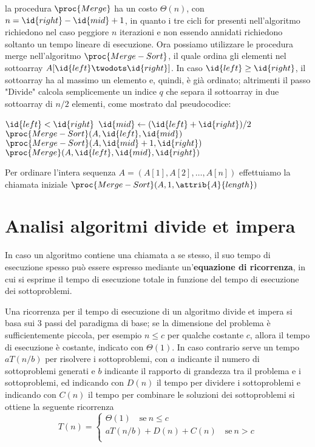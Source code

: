 la procedura $\proc{Merge}$ ha un costo $\Theta(n)$, con $n = \id{right} - \id{mid} + 1$, in quanto
i tre cicli for presenti nell'algoritmo richiedono nel caso peggiore $n$ iterazioni
e non essendo annidati richiedono soltanto un tempo lineare di esecuzione.
Ora possiamo utilizzare le procedura merge nell'algoritmo $\proc{Merge-Sort}$, il quale
ordina gli elementi nel sottoarray $A[\id{left}\twodots \id{right}]$.
In caso $\id{left} \geq \id{right}$, il sottoarray ha al massimo un elemento e, quindi, è già ordinato;
altrimenti il passo "Divide" calcola semplicemente un indice $q$ che separa il sottoarray
in due sottoarray di $n/2$ elementi, come mostrato dal pseudocodice:
\begin{codebox}
\li \If $\id{left} < \id{right}$
    \Then
\li     $\id{mid} \gets (\id{left} + \id{right})/ 2$
\li     $\proc{Merge-Sort}(A,\id{left},\id{mid})$
\li     $\proc{Merge-Sort}(A,\id{mid} + 1,\id{right})$
\li     $\proc{Merge}(A,\id{left},\id{mid},\id{right})$
    \End
\end{codebox}

Per ordinare l'intera sequenza $A = (A[1],A[2],\dots,A[n])$ effettuiamo la chiamata
iniziale $\proc{Merge-Sort}(A,1,\attrib{A}{length})$

\section{Analisi algoritmi divide et impera}
In caso un algoritmo contiene una chiamata a se stesso, il suo tempo di esecuzione
spesso può essere espresso mediante un'\textbf{equazione di ricorrenza}, in cui
si esprime il tempo di esecuzione totale in funzione del tempo di esecuzione dei sottoproblemi.

Una ricorrenza per il tempo di esecuzione di un algoritmo divide et impera si basa
sui 3 passi del paradigma di base; se la dimensione del problema è sufficientemente piccola,
per esempio $n \leq c$ per qualche costante $c$, allora il tempo di esecuzione è
costante, indicato con $\Theta(1)$.
In caso contrario serve un tempo $aT(n/b)$ per risolvere i sottoproblemi, con $a$
indicante il numero di sottoproblemi generati e $b$ indicante il rapporto di grandezza
tra il problema e i sottoproblemi, ed indicando con $D(n)$ il tempo per dividere
i sottoproblemi e indicando con $C(n)$ il tempo per combinare le soluzioni dei
sottoproblemi si ottiene la seguente ricorrenza
\begin{equation*}
    T(n) = \begin{cases} \Theta(1) \quad \text{se} \ n \leq c \\
                         aT(n/b) + D(n) + C(n) \quad \text{se} \ n > c\\
            \end{cases}
\end{equation*}

